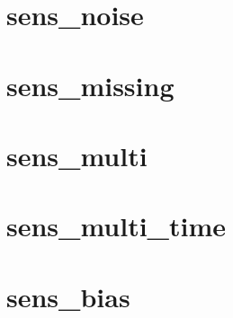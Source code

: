 \documentclass[11pt,a4paper]{article}
\begin{document}
\section*{sens\_noise}
\begin{center}

\end{center}
\clearpage
\section*{sens\_missing}
\begin{center}

\end{center}
\clearpage
\section*{sens\_multi}
\begin{center}

\end{center}
\clearpage
\section*{sens\_multi\_time}
\begin{center}

\end{center}
\clearpage
\section*{sens\_bias}
\begin{center}

\end{center}
\clearpage
\end{document}

